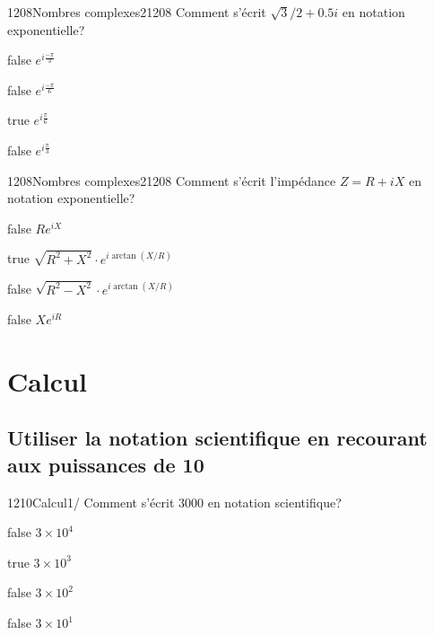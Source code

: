 \documentclass[11pt]{article}
\begin{document}
            \begin{question}{1208}{Nombres complexes}{2}{1208}
                Comment s'écrit $\sqrt{3}/2 + 0.5i$ en notation exponentielle?
            \end{question}

            \begin{reponses}
                \item[false] $e^{i\frac{-\pi}{3}}$
                \item[false]  $e^{i\frac{-\pi}{6}}$
                \item[true]  $e^{i\frac{\pi}{6}}$
                \item[false] $e^{i\frac{\pi}{3}}$
            \end{reponses}

            \begin{question}{1208}{Nombres complexes}{2}{1208}
                Comment s'écrit l'impédance $Z=R+iX$ en notation exponentielle?
            \end{question}

            \begin{reponses}
                \item[false] $Re^{iX}$
                \item[true]  $\sqrt{R^2+X^2}\cdot e^{i\arctan(X/R)}$
                \item[false]  $\sqrt{R^2-X^2}\cdot e^{i\arctan(X/R)}$
                \item[false] $Xe^{iR}$
            \end{reponses}

    \section{Calcul}
    
        \subsection{Utiliser la notation scientifique en recourant aux puissances de 10}
        
        	\begin{question}{1210}{Calcul}{1}{/}
				Comment s'écrit $3000$ en notation scientifique? 
            \end{question}

            \begin{reponses}
            	\item[false] $3\times 10^4$
            	\item[true] $3\times 10^3$
                \item[false] $3\times 10^2$
                \item[false] $3\times 10^1$
            \end{reponses}
        
\end{document}
